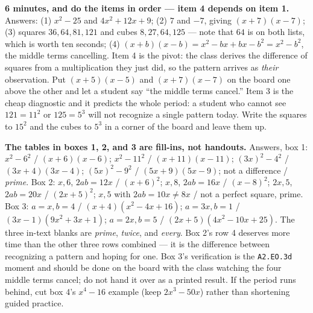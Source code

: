 \documentclass[10pt]{article}
\begin{document}
\begin{teachernote}[Warm-Up]
    \textbf{6 minutes, and do the items in order --- item 4 depends on item 1.} Answers:
    (1) $x^2-25$ and $4x^2+12x+9$; (2) $7$ and $-7$, giving $(x+7)(x-7)$; (3) squares $36, 64, 81,
    121$ and cubes $8, 27, 64, 125$ --- note that $64$ is on both lists, which is worth ten seconds;
    (4) $(x+b)(x-b) = x^2-bx+bx-b^2 = x^2-b^2$, the middle terms cancelling. Item 4 is the pivot:
    the class derives the difference of squares from a multiplication they just did, so the pattern
    arrives as \emph{their} observation. Put $(x+5)(x-5)$ and $(x+7)(x-7)$ on the board one above
    the other and let a student say ``the middle terms cancel.'' Item 3 is the cheap diagnostic and
    it predicts the whole period: a student who cannot see $121 = 11^2$ or $125 = 5^3$ will not
    recognize a single pattern today. Write the squares to $15^2$ and the cubes to $5^3$ in a corner
    of the board and leave them up.
\end{teachernote}

\begin{teachernote}
    \textbf{The tables in boxes 1, 2, and 3 are fill-ins, not handouts.} Answers, box 1:
    $x^2-6^2$ / $(x+6)(x-6)$; $x^2-11^2$ / $(x+11)(x-11)$; $(3x)^2-4^2$ / $(3x+4)(3x-4)$;
    $(5x)^2-9^2$ / $(5x+9)(5x-9)$; not a difference / \emph{prime}. Box 2: $x, 6$, $2ab=12x$ /
    $(x+6)^2$; $x, 8$, $2ab=16x$ / $(x-8)^2$; $2x, 5$, $2ab=20x$ / $(2x+5)^2$; $x, 5$ with
    $2ab=10x \ne 8x$ / not a perfect square, prime. Box 3: $a=x, b=4$ / $(x+4)(x^2-4x+16)$;
    $a=3x, b=1$ / $(3x-1)(9x^2+3x+1)$; $a=2x, b=5$ / $(2x+5)(4x^2-10x+25)$. The three in-text blanks
    are \emph{prime}, \emph{twice}, and \emph{every}. Box 2's row 4 deserves more time than the
    other three rows combined --- it is the difference between recognizing a pattern and hoping for
    one. Box 3's verification is the \texttt{A2.EO.3d} moment and should be done on the board with
    the class watching the four middle terms cancel; do not hand it over as a printed result. If the
    period runs behind, cut box 4's $x^4-16$ example (keep $2x^3-50x$) rather than shortening guided
    practice.
\end{teachernote}
\end{document}
